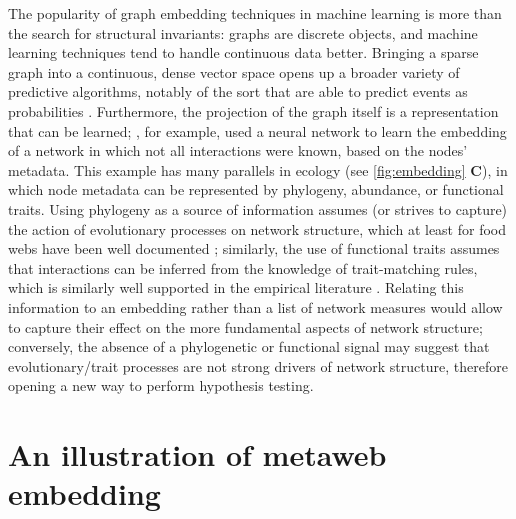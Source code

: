 The popularity of graph embedding techniques in machine learning is more
than the search for structural invariants: graphs are discrete objects,
and machine learning techniques tend to handle continuous data better.
Bringing a sparse graph into a continuous, dense vector space
\cite{Xu2021Understanding} opens up a broader variety of predictive
algorithms, notably of the sort that are able to predict events as
probabilities \cite{Murphy2022Probabilistic}. Furthermore, the
projection of the graph itself is a representation that can be learned;
\cite{Runghen2021Exploiting}, for example, used a neural network to learn the
embedding of a network in which not all interactions were known, based
on the nodes' metadata. This example has many parallels in ecology (see
\autoref{fig:embedding} \textbf{C}), in which node metadata can be represented by
phylogeny, abundance, or functional traits. Using phylogeny as a source
of information assumes (or strives to capture) the action of
evolutionary processes on network structure, which at least for food
webs have been well documented \cite{Braga2021Phylogenetic,
DallaRiva2016Exploring, Eklof2016Phylogenetic, Stouffer2007Evidence,
Stouffer2012Evolutionary}; similarly, the use of functional traits
assumes that interactions can be inferred from the knowledge of
trait-matching rules, which is similarly well supported in the empirical
literature \cite{Bartomeus2013Understanding, Bartomeus2016Common,
Goebel2023Body, Gravel2013Inferring}. Relating this information to
an embedding rather than a list of network measures would allow to
capture their effect on the more fundamental aspects of network
structure; conversely, the absence of a phylogenetic or functional
signal may suggest that evolutionary/trait processes are not strong
drivers of network structure, therefore opening a new way to perform
hypothesis testing.

\section{An illustration of metaweb
embedding}\label{an-illustration-of-metaweb-embedding}

